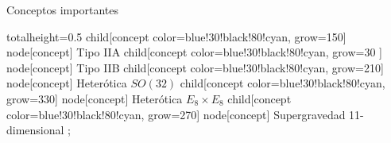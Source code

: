 \begin{frame}{
    Conceptos importantes
  }
{\begin{center}
\begin{adjustbox}{totalheight=0.5\textheight}
            child[concept color=blue!30!black!80!cyan, grow=150] {node[concept] {\textcolor{green!40!white}{ Tipo IIA                                   }}}
            child[concept color=blue!30!black!80!cyan, grow=30 ] {node[concept] {\textcolor{green!40!white}{ Tipo IIB                                   }}}
            child[concept color=blue!30!black!80!cyan, grow=210] {node[concept] {\textcolor{green!40!white}{ Heterótica $SO(32)$                        }}}
            child[concept color=blue!30!black!80!cyan, grow=330] {node[concept] {\textcolor{green!40!white}{ Heterótica $E_8 \times E_8$                }}}
            child[concept color=blue!30!black!80!cyan, grow=270] {node[concept] {\textcolor{green!40!white}{ \tiny Supergravedad 11-dimensional }}};
      \end{adjustbox}
    \end{center}
  }
\end{frame}
